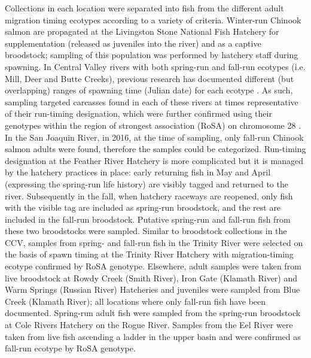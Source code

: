 Collections in each location were separated into fish from the different adult migration timing ecotypes according
to a variety of criteria.  Winter-run Chinook salmon are propagated at the Livingston
Stone National Fish Hatchery for supplementation (released as juveniles into the river) and as a captive broodstock;
sampling of this population was performed by hatchery staff during spawning. In Central Valley rivers with both
spring-run and fall-run ecotypes (i.e. Mill, Deer and Butte Creeks), previous research has documented different  (but overlapping) ranges of spawning time (Julian date) for each ecotype \citep{fry1961king,yoshiyama1998historical}.
As such, sampling targeted carcasses found in each of these
rivers at times representative of their run-timing designation, which were further confirmed using their genotypes
within the region of strongest association (RoSA) on chromosome 28 \citep{thompson2020complex}.
In the San Joaquin River, in 2016, at the time of sampling, only
fall-run Chinook salmon adults were found, therefore the samples could be categorized.  Run-timing
designation at the Feather River Hatchery is more complicated but it is managed by the hatchery practices in place:
early returning fish in May and April (expressing the spring-run life history) are visibly tagged and returned
to the river. Subsequently in the fall, when hatchery raceways are reopened, only fish with the visible tag are included
as spring-run broodstock, and the rest are included in the fall-run broodstock.
Putative spring-run and fall-run fish 
from these two broodstocks were sampled. Similar to broodstock collections in the CCV, samples from spring- and fall-run fish in the Trinity River were selected on the basis of spawn timing at the Trinity River Hatchery with migration-timing ecotype confirmed by RoSA genotype. Elsewhere, adult samples were taken from live broodstock at Rowdy Creek (Smith River), Iron Gate (Klamath River) and Warm Springs (Russian River) Hatcheries and juveniles were sampled from Blue Creek (Klamath River); all locations where only fall-run fish have been documented.  Spring-run adult fish were sampled from the spring-run broodstock at Cole Rivers Hatchery on the Rogue River. Samples from the Eel River were taken from live fish ascending a ladder in the upper basin and were confirmed as fall-run ecotype by RoSA genotype. 



